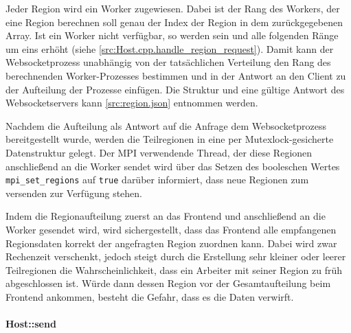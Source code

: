 Jeder Region wird ein Worker zugewiesen.
Dabei ist der Rang des Workers, der eine Region berechnen soll genau der Index der Region in dem zurückgegebenen Array.
Ist ein Worker nicht verfügbar, so werden sein und alle folgenden Ränge um eins erhöht (siehe \autoref{src:Host.cpp.handle_region_request}).
Damit kann der Websocketprozess unabhängig von der tatsächlichen Verteilung den Rang des berechnenden Worker-Prozesses
bestimmen und in der Antwort an den Client zu der Aufteilung der Prozesse einfügen.
Die Struktur und eine gültige Antwort des Websocketservers kann \autoref{src:region.json} entnommen werden.

Nachdem die Aufteilung als Antwort auf die Anfrage dem Websocketprozess bereitgestellt wurde, werden die Teilregionen in eine per Mutexlock-gesicherte Datenstruktur
gelegt. Der MPI verwendende Thread, der diese Regionen anschließend an die Worker sendet wird über das Setzen des booleschen Wertes \verb|mpi_set_regions|
auf \verb|true| darüber informiert, dass neue Regionen zum versenden zur Verfügung stehen.

Indem die Regionaufteilung zuerst an das Frontend und anschließend an die Worker gesendet wird,
wird sichergestellt, dass das Frontend alle empfangenen Regionsdaten korrekt der angefragten Region zuordnen kann.
Dabei wird zwar Rechenzeit verschenkt, jedoch steigt durch die Erstellung sehr kleiner oder leerer Teilregionen
die Wahrscheinlichkeit, dass ein Arbeiter mit seiner Region zu früh abgeschlossen ist.
Würde dann dessen Region vor der Gesamtaufteilung beim Frontend ankommen, besteht die Gefahr,
dass es die Daten verwirft.

\begin{figure}
	
\end{figure}

\begin{figure}
	
\end{figure}

\paragraph{Host::send}\label{cls:Host::send}

